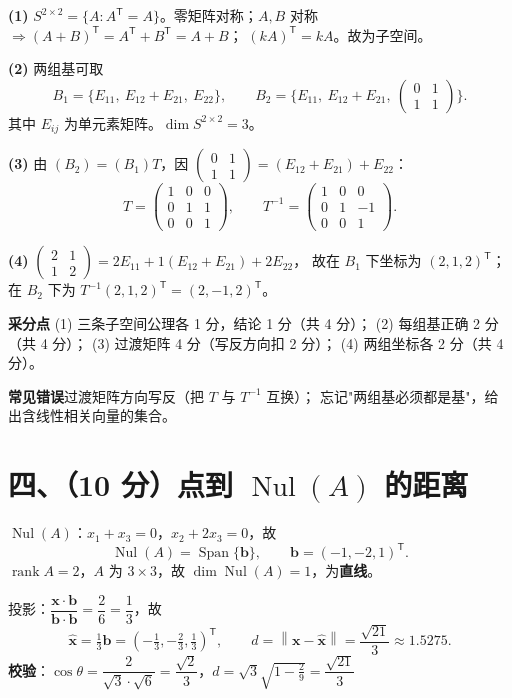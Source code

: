 \documentclass[11pt]{ctexart}
\newcommand{\rank}{\operatorname{rank}}
\newcommand{\Nul}{\operatorname{Nul}}
\newcommand{\Span}{\operatorname{Span}}
\newcommand{\TT}{^{\mathsf T}}
\newcommand{\bv}[1]{\begin{pmatrix}#1\end{pmatrix}}
\begin{document}
\begin{ansbox}
\textbf{(1)} $S^{2\times2}=\{A:A\TT=A\}$。零矩阵对称；$A,B$ 对称 $\Rightarrow(A+B)\TT=A\TT+B\TT=A+B$；
$(kA)\TT=kA$。故为子空间。

\textbf{(2)} 两组基可取
\[
B_1=\{E_{11},\ E_{12}+E_{21},\ E_{22}\},\qquad
B_2=\{E_{11},\ E_{12}+E_{21},\ \bv{0&1\\1&1}\}.
\]
其中 $E_{ij}$ 为单元素矩阵。$\dim S^{2\times2}=3$。

\textbf{(3)} 由 $(B_2)=(B_1)T$，因 $\bv{0&1\\1&1}=(E_{12}+E_{21})+E_{22}$：
\[
T=\bv{1&0&0\\0&1&1\\0&0&1},\qquad T^{-1}=\bv{1&0&0\\0&1&-1\\0&0&1}.
\]

\textbf{(4)} $\bv{2&1\\1&2}=2E_{11}+1(E_{12}+E_{21})+2E_{22}$，
故在 $B_1$ 下坐标为 $(2,1,2)\TT$；在 $B_2$ 下为 $T^{-1}(2,1,2)\TT=(2,-1,2)\TT$。
\end{ansbox}

\begin{scorebox}
\textbf{采分点}\quad
(1) 三条子空间公理各 1 分，结论 1 分（共 4 分）；
(2) 每组基正确 2 分（共 4 分）；
(3) 过渡矩阵 4 分（写反方向扣 2 分）；
(4) 两组坐标各 2 分（共 4 分）。

\textbf{常见错误}\quad 过渡矩阵方向写反（把 $T$ 与 $T^{-1}$ 互换）；
忘记"两组基必须都是基"，给出含线性相关向量的集合。
\end{scorebox}

\section*{四、（10 分）点到 $\Nul(A)$ 的距离}

\begin{ansbox}
$\Nul(A)$：$x_1+x_3=0$，$x_2+2x_3=0$，故
\[
\Nul(A)=\Span\{\mathbf b\},\qquad \mathbf b=(-1,-2,1)\TT .
\]
$\rank A=2$，$A$ 为 $3\times3$，故 $\dim\Nul(A)=1$，为\textbf{直线}。

投影：$\dfrac{\mathbf x\cdot\mathbf b}{\mathbf b\cdot\mathbf b}=\dfrac{2}{6}=\dfrac13$，故
\[
\hat{\mathbf x}=\tfrac13\mathbf b=\left(-\tfrac13,-\tfrac23,\tfrac13\right)\TT,
\qquad d=\left\lVert\mathbf x-\hat{\mathbf x}\right\rVert=\frac{\sqrt{21}}{3}\approx1.5275 .
\]
\textbf{校验}：$\cos\theta=\dfrac{2}{\sqrt3\cdot\sqrt6}=\dfrac{\sqrt2}{3}$，$d=\sqrt3\sqrt{1-\tfrac29}=\dfrac{\sqrt{21}}{3}$ \checkmark
\end{ansbox}
\end{document}
